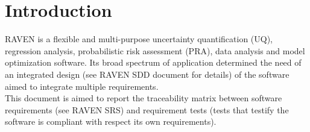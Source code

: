 \section{Introduction}
RAVEN is a flexible and multi-purpose uncertainty quantification (UQ), regression analysis, probabilistic risk assessment 
(PRA), data analysis and model optimization software.  
Its broad spectrum of application determined the need of an integrated design (see RAVEN SDD document for  details)
of the software aimed to integrate multiple requirements.
\\This document is aimed to report the traceability matrix between software requirements
(see RAVEN SRS) and requirement tests (tests that testify the software is compliant
with respect its own requirements).
